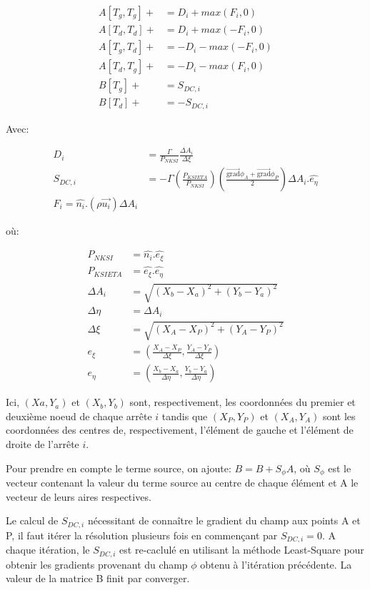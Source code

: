 \documentclass[12pt]{article}
\begin{document}
\begin{align}
	A[T_g,T_g] + &= D_i + max(F_i,0)\\
	A[T_d,T_d] + &= D_i + max(-F_i,0)\\
	A[T_g,T_d] + &= -D_i - max(-F_i,0)\\
	A[T_d,T_g] + &= -D_i - max(F_i,0)\\
	B[T_g] + &= S_{DC,i} \\
	B[T_d] + &= -S_{DC,i}
\end{align}

Avec:

\begin{align}
	D_i &= \frac{\Gamma}{P_{NKSI}} \frac{\Delta A_i}{\Delta \xi} \\
	S_{DC,i} &= -\Gamma \left(\frac{P_{KSIETA}}{P_{NKSI}}\right) \left(\frac{\overrightarrow{\mathrm{grad}} \phi_A + \overrightarrow{\mathrm{grad}} \phi_P}{2}\right) \Delta A_i . \hat{e_{\eta}} \\
	F_i = \hat{n_i}.(\rho \overrightarrow{u_i}) \Delta A_i
\end{align}

où:

\begin{align}
	P_{NKSI} &= \hat{n_i}.\hat{e_{\xi}} \\
	P_{KSIETA} &= \hat{e_{\xi}}.\hat{e_{\eta}} \\
	\Delta A_i &= \sqrt{(X_b-X_a)^2+(Y_b-Y_a)^2} \\
	\Delta \eta &= \Delta A_i \\
	\Delta \xi &= \sqrt{(X_A-X_P)^2+(Y_A-Y_P)^2} \\
	e_{\xi} &= \left(\frac{X_A-X_P}{\Delta \xi}, \frac{Y_A-Y_P}{\Delta \xi}\right) \\
	e_{\eta} &= \left(\frac{X_b-X_a}{\Delta \eta}, \frac{Y_b-Y_a}{\Delta \eta}\right)
\end{align}

Ici, $(Xa, Y_a)$ et $(X_b,Y_b)$ sont, respectivement, les coordonnées du premier et deuxième noeud de chaque arrête $i$ tandis que $(X_P,Y_P)$ et $(X_A,Y_A)$ sont les coordonnées des centres de, respectivement, l'élément de gauche et l'élément de droite de l'arrête $i$.

Pour prendre en compte le terme source, on ajoute: $B = B+S_{\phi}A$, où $S_{\phi}$ est le vecteur contenant la valeur du terme source au centre de chaque élément et A le vecteur de leurs aires respectives.

Le calcul de $S_{DC,i}$ nécessitant de connaître le gradient du champ aux points A et P, il faut itérer la résolution plusieurs fois en commençant par $S_{DC,i}=0$. A chaque itération, le $S_{DC,i}$ est re-caclulé en utilisant la méthode Least-Square pour obtenir les gradients provenant du champ $\phi$ obtenu à l'itération précédente. La valeur de la matrice B finit par converger.
\end{document}

